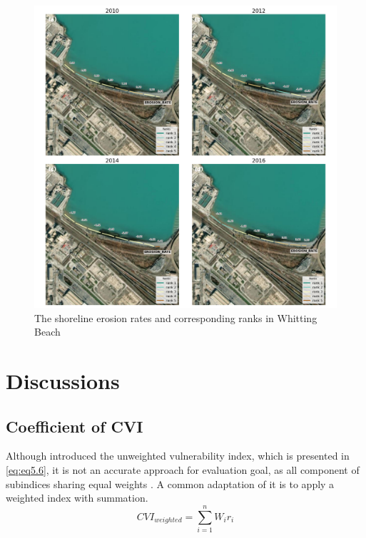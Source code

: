 \begin{figure}[htbp]
  \centering
  \includegraphics[width=1\textwidth]{chapter5/resources/site2_erosion.png}
  \caption{The shoreline erosion rates and corresponding ranks in Whitting Beach}
  \label{fig:s2_erosion}
\end{figure}



\section{Discussions}
\label{c5_Discussions}

\subsection{Coefficient of CVI}
\label{Coefficient of CVI}

Although \citet{gornitz_global_1991} introduced the unweighted vulnerability index,
which is presented in \ref{eq:eq5.6}, it is not an accurate approach for evaluation goal,
as all component of subindices sharing equal weights \citet{fu2022characteristics}. A common
adaptation of it is to apply a weighted index with summation.
\begin{equation}
  CVI_{weighted} = \sum_{i=1}^{n}W_ir_i
\label{eq:eq5.7}
\end{equation}

